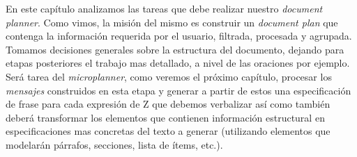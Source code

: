 \bigskip
En este capítulo analizamos las tareas que debe realizar nuestro \emph{document planner}. Como vimos, la misión del mismo es construir un \emph{document plan} que contenga la información requerida por el usuario, filtrada, procesada y agrupada. Tomamos decisiones generales sobre la estructura del documento, dejando para etapas posteriores el trabajo mas detallado, a nivel de las oraciones por ejemplo. Será tarea del \emph{microplanner}, como veremos el próximo capítulo, procesar los \emph{mensajes} construidos en esta etapa y generar a partir de estos una especificación de frase para cada expresión de Z que debemos verbalizar así como también deberá transformar los elementos que contienen información estructural en especificaciones mas concretas del texto a generar (utilizando elementos que modelarán párrafos, secciones, lista de ítems, etc.).
